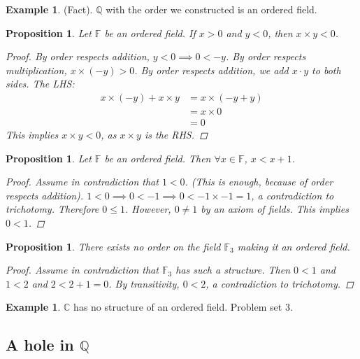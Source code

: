 \documentclass[10pt]{article}
\newcommand{\C}{\mathbb{C}}
\newcommand{\F}{\mathbb{F}}
\newcommand{\Q}{\mathbb{Q}}
\newtheorem{proposition}[theorem]{Proposition}
\theoremstyle{definition}
\newtheorem{example}[theorem]{Example}
\theoremstyle{remark}
\begin{document}
\begin{example}
    (Fact). $\Q$ with the order we constructed is an ordered field.
\end{example}

\begin{proposition}
    Let $\F$ be an ordered field. If $x > 0$ and $y < 0$, then $x \times y < 0$.
    \begin{proof}
        By order respects addition, $y < 0 \implies 0 < -y$. By order respects multiplication, $x \times (-y) > 0$. By order respects addition, we add $x \cdot y$ to both sides.
        The LHS:
        \begin{align*}
            x \times (-y) + x \times y &= x \times (-y + y) \\
            &= x \times 0 \\
            &= 0
        \end{align*}
        This implies $x \times y < 0$, as $x \times y$ is the RHS.
    \end{proof}
\end{proposition}

\begin{proposition}
    Let $\F$ be an ordered field. Then $\forall x \in \F$, $x < x + 1$.
    \begin{proof}
        Assume in contradiction that $1 < 0$. (This is enough, because of order respects addition).
        $1 < 0 \implies 0 < -1 \implies 0 < -1 \times -1 = 1$, a contradiction to trichotomy.
        Therefore $0 \leq 1$. However, $0 \neq 1$ by an axiom of fields. This implies $0 < 1$.
    \end{proof}
\end{proposition}

\begin{proposition}
    There exists no order on the field $\F_3$ making it an ordered field.
    \begin{proof}
        Assume in contradiction that $\F_3$ has such a structure.
        Then $0 < 1$ and $1 < 2$ and $2 < 2 + 1 = 0$.
        By transitivity, $0 < 2$, a contradiction to trichotomy.
    \end{proof}
\end{proposition}

\begin{example}
    $\C$ has no structure of an ordered field. Problem set 3.
\end{example}

\subsection{A hole in $\Q$}
\end{document}

